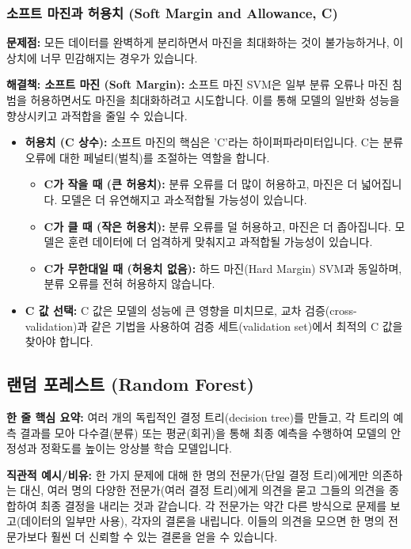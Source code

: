\documentclass[11pt,a4paper]{article}
\theoremstyle{definition}
\begin{document}
\subsubsection*{소프트 마진과 허용치 (Soft Margin and Allowance, C)}

\textbf{문제점:} 모든 데이터를 완벽하게 분리하면서 마진을 최대화하는 것이 불가능하거나, 이상치에 너무 민감해지는 경우가 있습니다.

\textbf{해결책: 소프트 마진 (Soft Margin):}
소프트 마진 SVM은 일부 분류 오류나 마진 침범을 허용하면서도 마진을 최대화하려고 시도합니다. 이를 통해 모델의 일반화 성능을 향상시키고 과적합을 줄일 수 있습니다.

\begin{itemize}
    \item \textbf{허용치 (C 상수):} 소프트 마진의 핵심은 'C'라는 하이퍼파라미터입니다. C는 분류 오류에 대한 페널티(벌칙)를 조절하는 역할을 합니다.
        \begin{itemize}
            \item \textbf{C가 작을 때 (큰 허용치):} 분류 오류를 더 많이 허용하고, 마진은 더 넓어집니다. 모델은 더 유연해지고 과소적합될 가능성이 있습니다.
            \item \textbf{C가 클 때 (작은 허용치):} 분류 오류를 덜 허용하고, 마진은 더 좁아집니다. 모델은 훈련 데이터에 더 엄격하게 맞춰지고 과적합될 가능성이 있습니다.
            \item \textbf{C가 무한대일 때 (허용치 없음):} 하드 마진(Hard Margin) SVM과 동일하며, 분류 오류를 전혀 허용하지 않습니다.
        \end{itemize}
    \item \textbf{C 값 선택:} C 값은 모델의 성능에 큰 영향을 미치므로, 교차 검증(cross-validation)과 같은 기법을 사용하여 검증 세트(validation set)에서 최적의 C 값을 찾아야 합니다.
\end{itemize}

\newpage
\subsection{랜덤 포레스트 (Random Forest)}

\begin{conceptbox}
\textbf{한 줄 핵심 요약:} 여러 개의 독립적인 결정 트리(decision tree)를 만들고, 각 트리의 예측 결과를 모아 다수결(분류) 또는 평균(회귀)을 통해 최종 예측을 수행하여 모델의 안정성과 정확도를 높이는 앙상블 학습 모델입니다.
\end{conceptbox}

\textbf{직관적 예시/비유:}
한 가지 문제에 대해 한 명의 전문가(단일 결정 트리)에게만 의존하는 대신, 여러 명의 다양한 전문가(여러 결정 트리)에게 의견을 묻고 그들의 의견을 종합하여 최종 결정을 내리는 것과 같습니다. 각 전문가는 약간 다른 방식으로 문제를 보고(데이터의 일부만 사용), 각자의 결론을 내립니다. 이들의 의견을 모으면 한 명의 전문가보다 훨씬 더 신뢰할 수 있는 결론을 얻을 수 있습니다.
\end{document}

